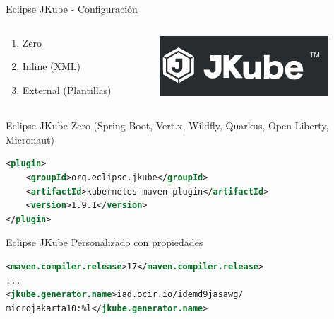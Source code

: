 \documentclass[aspectratio=169]{beamer}
\begin{document}
\begin{frame}{Eclipse JKube - Configuración}
	\begin{columns}[T] %
		
		\begin{column}[T]{4cm} %
		\begin{enumerate}
			\item Zero
			\item Inline (XML)
            \item External (Plantillas)
		\end{enumerate}
		\end{column}
		\begin{column}[T]{6cm} %
\begin{figure}
\centering
\includegraphics[width=0.7\linewidth]{Images/jkube}
\end{figure}
			
		\end{column}
	\end{columns}
\end{frame}

\begin{frame}[fragile]{Eclipse JKube}
Zero (Spring Boot, Vert.x, Wildfly, Quarkus, Open Liberty, Micronaut)
\begin{lstlisting}[language=XML]
<plugin>
    <groupId>org.eclipse.jkube</groupId>
    <artifactId>kubernetes-maven-plugin</artifactId>
    <version>1.9.1</version>
</plugin>
\end{lstlisting}

\end{frame}

\begin{frame}[fragile]{Eclipse JKube}
Personalizado con propiedades
\begin{lstlisting}[language=XML]
<maven.compiler.release>17</maven.compiler.release>
...
<jkube.generator.name>iad.ocir.io/idemd9jasawg/
microjakarta10:%l</jkube.generator.name>
\end{lstlisting}

\end{frame}
\end{document}
